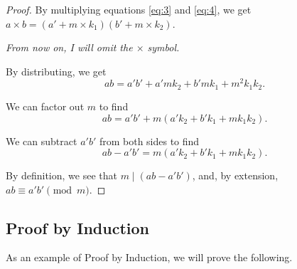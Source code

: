 \documentclass{article}
\theoremstyle{definition}
\begin{document}
\begin{enumerate}
{\begin{proof}
            By multiplying equations \ref{eq:3} and \ref{eq:4}, we get 
            \(a \times b = (a' + m\times k_1) (b' + m\times k_2)\).

            \textit{From now on, I will omit the \(\times\) symbol.}

            By distributing, we get 
            \[ab = a'b' + a'mk_2 + b'mk_1 + m^2k_1k_2.\]
            
            We can factor out \(m\) to find 
            \[ab = a'b' + m(a'k_2 + b'k_1 + mk_1k_2).\]

            We can subtract \(a'b'\) from both sides to find 
            \[ab - a'b' = m(a'k_2 + b'k_1 + mk_1k_2).\]

            By definition, we see that \(m \mid (ab - a'b')\), and, by extension, 
            \(ab \equiv a'b' \pmod{m}\).
                
        \end{proof}
    }
\end{enumerate}

\subsection{Proof by Induction}
As an example of Proof by Induction, we will prove the following.
\end{document}
